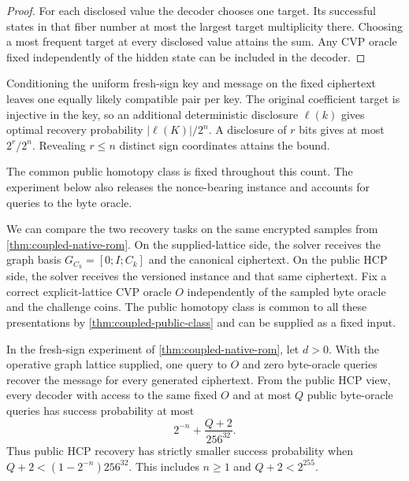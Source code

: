 \begin{proof}
For each disclosed value the decoder chooses one target. Its successful
states in that fiber number at most the largest target multiplicity there.
Choosing a most frequent target at every disclosed value attains the sum.
Any CVP oracle fixed independently of the hidden state can be included in
the decoder.
\end{proof}

Conditioning the uniform fresh-sign key and message on the fixed ciphertext
leaves one equally likely compatible pair per key. The original coefficient
target is injective in the key, so an additional deterministic disclosure
\(\ell(k)\) gives optimal recovery probability \(|\ell(K)|/2^n\).
A disclosure of \(r\) bits gives at most \(2^r/2^n\). Revealing \(r\leq n\)
distinct sign coordinates attains the bound.

The common public homotopy class is fixed throughout this count. The
experiment below also releases the nonce-bearing instance and accounts for
queries to the byte oracle.

We can compare the two recovery tasks on the same encrypted samples from
\cref{thm:coupled-native-rom}. On the supplied-lattice side, the solver
receives the graph basis \(G_{C_k}=[0;I;C_k]\) and the canonical
ciphertext. On the public HCP side, the solver receives the versioned
instance and that same ciphertext. Fix a correct explicit-lattice CVP oracle
\(O\) independently of the sampled byte oracle and the challenge coins.
The public homotopy class is common to all these presentations by
\cref{thm:coupled-public-class} and can be supplied as a fixed input.

\begin{theorem}
\label{thm:strict-native-cvp-separation}
In the fresh-sign experiment of \cref{thm:coupled-native-rom}, let \(d>0\).
With the operative graph lattice supplied, one query to \(O\) and zero
byte-oracle queries recover the message for every generated ciphertext.
From the public HCP view, every
decoder with access to the same fixed \(O\) and at most \(Q\) public byte-oracle
queries has success probability at most
\[
  2^{-n}+\frac{Q+2}{256^{32}}.
\]
Thus public HCP recovery has strictly smaller success probability when
\(Q+2<(1-2^{-n})256^{32}\). This includes \(n\geq 1\) and \(Q+2<2^{255}\).
\end{theorem}


